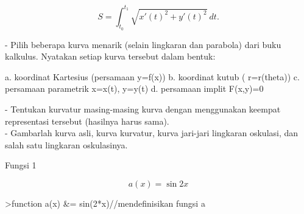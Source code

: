\documentclass[12pt,arial,letterpaper]{book}
\begin{document}
\begin{eulercomment}
\begin{eulercomment}
\begin{eulercomment}
\begin{eulercomment}
\begin{eulercomment}
\begin{eulercomment}
\begin{eulercomment}
\begin{eulercomment}
\begin{eulercomment}
\begin{eulercomment}
\begin{eulercomment}
\begin{eulercomment}
\begin{eulercomment}
\begin{eulercomment}
\begin{eulercomment}
\begin{eulercomment}
\begin{eulercomment}
\begin{eulercomment}
\begin{eulercomment}
\begin{eulercomment}
\begin{eulercomment}
\begin{eulercomment}
\begin{eulercomment}
\end{eulercomment}
\begin{eulerformula}
\[
S=\int_{t_0}^{t_1} \sqrt{x'(t)^2+y'(t)^2}\ dt.
\]
\end{eulerformula}
\begin{eulercomment}
- Pilih beberapa kurva menarik (selain lingkaran dan parabola) dari
buku  kalkulus. Nyatakan setiap kurva tersebut dalam bentuk:\\
\end{eulercomment}
\begin{eulerttcomment}
  a. koordinat Kartesius (persamaan y=f(x))
  b. koordinat kutub ( r=r(theta))
  c. persamaan parametrik x=x(t), y=y(t)
  d. persamaan implit F(x,y)=0
\end{eulerttcomment}
\begin{eulercomment}
- Tentukan kurvatur masing-masing kurva dengan menggunakan keempat
representasi tersebut (hasilnya harus sama).\\
- Gambarlah kurva asli, kurva kurvatur, kurva jari-jari lingkaran
oskulasi, dan salah satu lingkaran oskulasinya.

\end{eulercomment}
\begin{eulercomment}
Fungsi 1\\
\end{eulercomment}
\begin{eulerformula}
\[
a(x)=\sin{2x}
\]
\end{eulerformula}
\begin{eulerprompt}
>function a(x) &= sin(2*x)//mendefinisikan fungsi a
\end{eulerprompt}
\begin{euleroutput}
  

\end{euleroutput}
\end{eulercomment}
\end{eulercomment}
\end{eulercomment}
\end{eulercomment}
\end{eulercomment}
\end{eulercomment}
\end{eulercomment}
\end{eulercomment}
\end{eulercomment}
\end{eulercomment}
\end{eulercomment}
\end{eulercomment}
\end{eulercomment}
\end{eulercomment}
\end{eulercomment}
\end{eulercomment}
\end{eulercomment}
\end{eulercomment}
\end{eulercomment}
\end{eulercomment}
\end{eulercomment}
\end{eulercomment}
\end{document}
